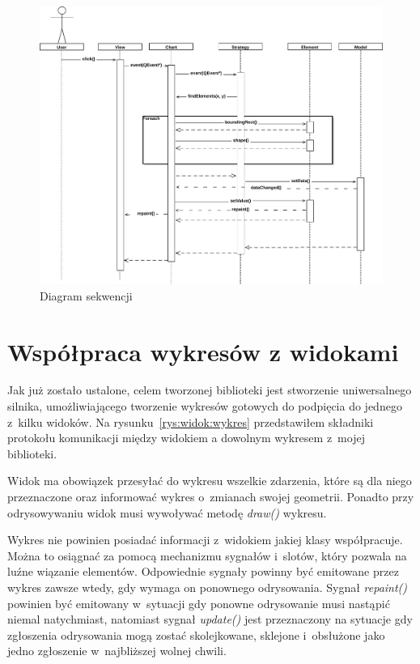 \begin{figure}
\centering
\caption{Diagram sekwencji}\label{rys:seq:inter}
\includegraphics[scale=0.6]{img/seq_inter.pdf}
\end{figure}

\section{Współpraca wykresów z widokami }
Jak już zostało ustalone, celem tworzonej biblioteki jest stworzenie uniwersalnego silnika, umożliwiającego tworzenie wykresów gotowych do podpięcia do jednego z~kilku widoków. Na rysunku~\ref{rys:widok:wykres} przedstawiłem składniki protokołu komunikacji między widokiem a dowolnym wykresem z~mojej biblioteki.

Widok ma obowiązek przesyłać do wykresu wszelkie zdarzenia, które są dla niego przeznaczone oraz informować wykres o~zmianach swojej geometrii. Ponadto przy odrysowywaniu widok musi wywoływać metodę \textit{draw()} wykresu.

Wykres nie powinien posiadać informacji z~widokiem jakiej klasy współpracuje. Można to osiągnać za pomocą mechanizmu sygnałów i~slotów, który pozwala na luźne wiązanie elementów. Odpowiednie sygnały  powinny być emitowane przez wykres zawsze wtedy, gdy wymaga on ponownego odrysowania.
Sygnał \textit{repaint()} powinien być emitowany w~sytuacji gdy ponowne odrysowanie musi nastąpić niemal natychmiast, natomiast sygnał \textit{update()} jest przeznaczony na sytuacje gdy zgłoszenia odrysowania mogą zostać skolejkowane, sklejone i~obsłużone jako jedno zgłoszenie w~najbliższej wolnej chwili.


